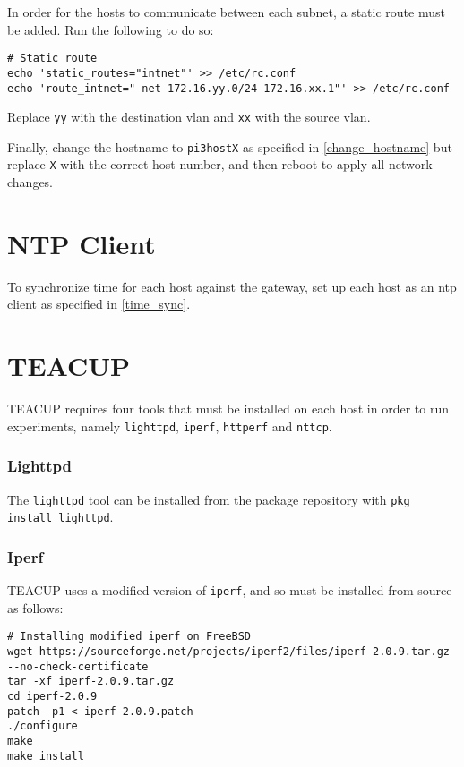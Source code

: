 In order for the hosts to communicate between each subnet, a static route must be added. Run the following to do so:

\begin{verbatim}
# Static route
echo 'static_routes="intnet"' >> /etc/rc.conf
echo 'route_intnet="-net 172.16.yy.0/24 172.16.xx.1"' >> /etc/rc.conf
\end{verbatim}

Replace \lstinline{yy} with the destination \gls{vlan} and \lstinline{xx} with the source \gls{vlan}.

Finally, change the hostname to \lstinline{pi3hostX} as specified in \ref{change_hostname} but replace \lstinline{X} with the correct host number, and then reboot to apply all network changes.


\section{NTP Client}

To synchronize time for each host against the gateway, set up each host as an \gls{ntp} client as specified in \ref{time_sync}.


\section{TEACUP}

TEACUP requires four tools that must be installed on each host in order to run experiments, namely \lstinline{lighttpd},  \lstinline{iperf}, \lstinline{httperf} and \lstinline{nttcp}.

\subsubsection{Lighttpd}

The \lstinline{lighttpd} tool can be installed from the package repository with \lstinline{pkg install lighttpd}.

\subsubsection{Iperf}

TEACUP uses a modified version of \lstinline{iperf}, and so must be installed from source as follows:

\begin{verbatim}
# Installing modified iperf on FreeBSD
wget https://sourceforge.net/projects/iperf2/files/iperf-2.0.9.tar.gz --no-check-certificate
tar -xf iperf-2.0.9.tar.gz
cd iperf-2.0.9
patch -p1 < iperf-2.0.9.patch
./configure
make
make install
\end{verbatim}

